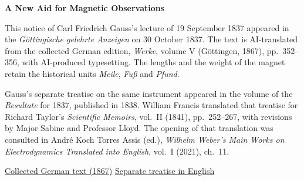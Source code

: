 \clearpage
\thispagestyle{empty}
\begin{center}\Large\textbf{A New Aid for Magnetic Observations}\end{center}

This notice of Carl Friedrich Gauss's lecture of 19 September 1837 appeared in the \textit{Göttingische gelehrte Anzeigen} on 30 October 1837. The text is AI-translated from the collected German edition, \textit{Werke}, volume V (Göttingen, 1867), pp.~352--356, with AI-produced typesetting. The lengths and the weight of the magnet retain the historical units \textit{Meile}, \textit{Fuß} and \textit{Pfund}.

\medskip\noindent
Gauss's separate treatise on the same instrument appeared in the volume of the \textit{Resultate} for 1837, published in 1838. William Francis translated that treatise for Richard Taylor's \textit{Scientific Memoirs}, vol.~II (1841), pp.~252--267, with revisions by Major Sabine and Professor Lloyd. The opening of that translation was consulted in André Koch Torres Assis (ed.), \textit{Wilhelm Weber's Main Works on Electrodynamics Translated into English}, vol.~I (2021), ch.~11.

\medskip\noindent
\href{https://gdz.sub.uni-goettingen.de/id/PPN236006339}{Collected German text (1867)}\quad
\href{https://www.ifi.unicamp.br/~assis/Weber-in-English-Vol-1.pdf\#page=126}{Separate treatise in English}
\clearpage
